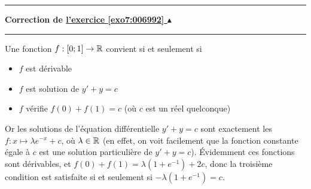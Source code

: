 \documentclass[11pt,a4paper]{article}
\newcounter{exo}
\newcommand{\correction}[1]{\hypertarget{cor7:#1}{}\label{cor7:#1}{\bf Correction de \hyperlink{exo7:#1}{l'exercice \ref{exo7:#1} $\blacktriangle$}}\vspace{1mm}\hrule\vspace{1mm}}
\newcommand{\fincorrection}{\vspace{1mm}\hrule\vspace*{7mm}}
\begin{document}
\fincorrection
\correction{006992}
Une fonction $f:[0;1]\to\mathbb{R}$ convient si et seulement si 
\begin{itemize}
\item $f$ est dérivable
\item $f$ est solution de $y'+y=c$ 
\item $f$ vérifie $f(0)+f(1)=c$ (où $c$ est un réel quelconque)
\end{itemize}
Or les solutions de l'équation différentielle $y'+y=c$ sont exactement les 
$f:x\mapsto \lambda e^{-x}+c$, où $\lambda\in\mathbb{R}$ (en effet, on voit facilement que 
la fonction constante égale à $c$ est une solution particulière de $y'+y=c$). \'Evidemment ces fonctions sont dérivables, et $f(0)+f(1)=\lambda(1+e^{-1})+2c$, donc la troisième condition est satisfaite si et seulement si $-\lambda(1+e^{-1})=c$.
\end{document}
